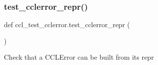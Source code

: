 \subsubsection{\texorpdfstring{test\+\_\+cclerror\+\_\+repr()}{test\_cclerror\_repr()}}
{\footnotesize\ttfamily def ccl\+\_\+test\+\_\+cclerror.\+test\+\_\+cclerror\+\_\+repr (\begin{DoxyParamCaption}{ }\end{DoxyParamCaption})}

\begin{DoxyVerb}Check that a CCLError can be built from its repr\end{DoxyVerb}
 